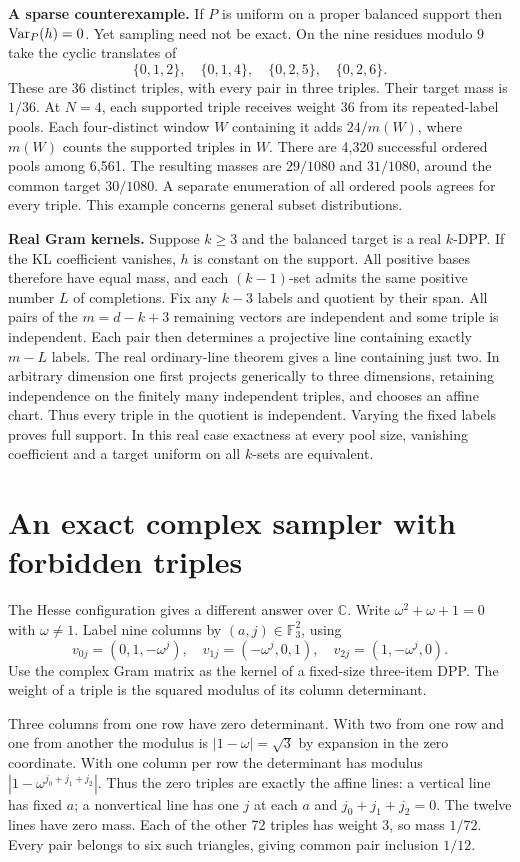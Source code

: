 \documentclass[11pt]{article}
\begin{document}
\textbf{A sparse counterexample.} If $P$ is uniform on a proper balanced support then $\operatorname{Var}_P(h)=0$. Yet sampling need not be exact. On the nine residues modulo $9$ take the cyclic translates of
\[
 \{0,1,2\},\quad\{0,1,4\},\quad\{0,2,5\},\quad\{0,2,6\}.
\]
These are 36 distinct triples, with every pair in three triples. Their target mass is $1/36$. At $N=4$, each supported triple receives weight 36 from its repeated-label pools. Each four-distinct window $W$ containing it adds $24/m(W)$, where $m(W)$ counts the supported triples in $W$. There are 4,320 successful ordered pools among 6,561. The resulting masses are $29/1080$ and $31/1080$, around the common target $30/1080$. A separate enumeration of all ordered pools agrees for every triple. This example concerns general subset distributions.

\textbf{Real Gram kernels.} Suppose $k\ge3$ and the balanced target is a real $k$-DPP. If the KL coefficient vanishes, $h$ is constant on the support. All positive bases therefore have equal mass, and each $(k-1)$-set admits the same positive number $L$ of completions. Fix any $k-3$ labels and quotient by their span. All pairs of the $m=d-k+3$ remaining vectors are independent and some triple is independent. Each pair then determines a projective line containing exactly $m-L$ labels. The real ordinary-line theorem \cite{kelly} gives a line containing just two. In arbitrary dimension one first projects generically to three dimensions, retaining independence on the finitely many independent triples, and chooses an affine chart. Thus every triple in the quotient is independent. Varying the fixed labels proves full support. In this real case exactness at every pool size, vanishing coefficient and a target uniform on all $k$-sets are equivalent.

\newpage
\section{An exact complex sampler with forbidden triples}
The Hesse configuration \cite{stacey} gives a different answer over $\mathbb C$. Write $\omega^2+\omega+1=0$ with $\omega\ne1$. Label nine columns by $(a,j)\in\mathbb F_3^2$, using
\[
 v_{0j}=(0,1,-\omega^j),\quad
 v_{1j}=(-\omega^j,0,1),\quad
 v_{2j}=(1,-\omega^j,0).
\]
Use the complex Gram matrix as the kernel of a fixed-size three-item DPP. The weight of a triple is the squared modulus of its column determinant.

Three columns from one row have zero determinant. With two from one row and one from another the modulus is $|1-\omega|=\sqrt3$ by expansion in the zero coordinate. With one column per row the determinant has modulus $|1-\omega^{j_0+j_1+j_2}|$. Thus the zero triples are exactly the affine lines: a vertical line has fixed $a$; a nonvertical line has one $j$ at each $a$ and $j_0+j_1+j_2=0$. The twelve lines have zero mass. Each of the other 72 triples has weight 3, so mass $1/72$. Every pair belongs to six such triangles, giving common pair inclusion $1/12$.
\end{document}
